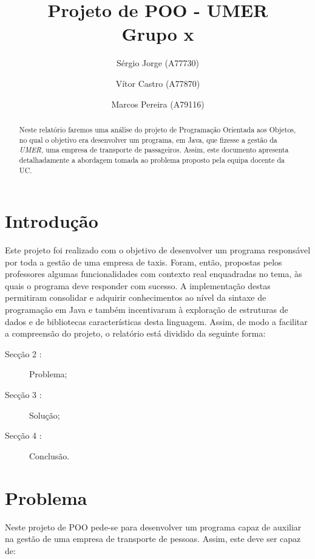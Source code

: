 \documentclass[a4paper]{article}
\title{Projeto de POO - UMER\\Grupo x}
\author{Sérgio Jorge (A77730) \and Vítor Castro (A77870) \and Marcos Pereira (A79116)}
\date{}
\begin{document}
\maketitle

\begin{abstract}
Neste relatório faremos uma análise do projeto de Programação Orientada aos Objetos, no qual o objetivo era desenvolver um programa, em Java, que fizesse a gestão da \textit{UMER},  uma empresa de transporte de passageiros. Assim, este documento apresenta detalhadamente a abordagem tomada ao problema proposto pela equipa docente da UC.
\end{abstract}

\tableofcontents

\section{Introdução}
\label{sec:intro}

Este projeto foi realizado com o objetivo de desenvolver um programa responsável por toda a gestão de uma empresa de taxis. Foram, então, propostas pelos professores algumas funcionalidades com contexto real enquadradas no tema, às quais o programa deve responder com sucesso. A implementação destas permitiram consolidar e adquirir conhecimentos ao nível da sintaxe de programação em Java e também incentivaram à exploração de estruturas de dados e de bibliotecas características desta linguagem. 
Assim, de modo a facilitar a compreensão do projeto, o relatório está dividido da seguinte forma:

\begin{description}
    \item[Secção 2 :] Problema;
    \item[Secção 3 :] Solução;
    \item[Secção 4 :] Conclusão.
\end{description}
\pagebreak

\section{Problema}
\label{sec:problema}
Neste projeto de POO pede-se para desenvolver um programa capaz de auxiliar na gestão de uma empresa de transporte de pessoas. Assim, este deve ser capaz de:
\end{document}
